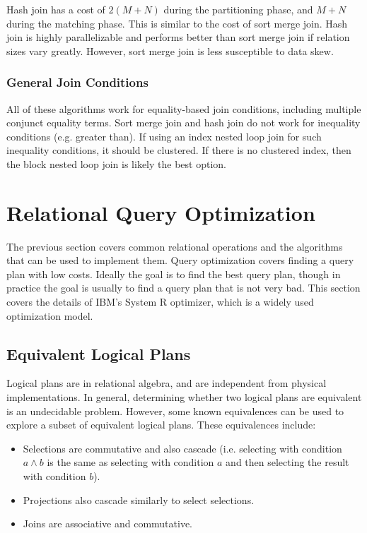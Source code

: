 \documentclass[12pt,titlepage]{article}
\let\stdsection\section
\renewcommand\section{\clearpage\stdsection}
\begin{document}
        Hash join has a cost of $2(M + N)$ during the partitioning phase, and $M + N$ during the matching phase. This is similar to the cost of sort merge join.
        Hash join is highly parallelizable and performs better than sort merge join if relation sizes vary greatly. However, sort merge join is less susceptible
        to data skew.

      \subsubsection{General Join Conditions}
        All of these algorithms work for equality-based join conditions, including multiple conjunct equality terms. Sort merge join and hash join do not work for
        inequality conditions (e.g. greater than). If using an index nested loop join for such inequality conditions, it should be clustered. If there is no clustered
        index, then the block nested loop join is likely the best option.

  \section{Relational Query Optimization}
    The previous section covers common relational operations and the algorithms that can be used to implement them. Query optimization covers finding a query plan with
    low costs. Ideally the goal is to find the best query plan, though in practice the goal is usually to find a query plan that is not very bad. This section covers
    the details of IBM's System R optimizer, which is a widely used optimization model.

    \subsection{Equivalent Logical Plans}
      Logical plans are in relational algebra, and are independent from physical implementations. In general, determining whether two logical plans are equivalent is
      an undecidable problem. However, some known equivalences can be used to explore a subset of equivalent logical plans. These equivalences include:
      \begin{itemize}
        \item Selections are commutative and also cascade (i.e. selecting with condition $a \land b$ is the same as selecting with condition $a$ and then selecting the
          result with condition $b$).
        \item Projections also cascade similarly to select selections.
        \item Joins are associative and commutative.
      \end{itemize}
\end{document}
